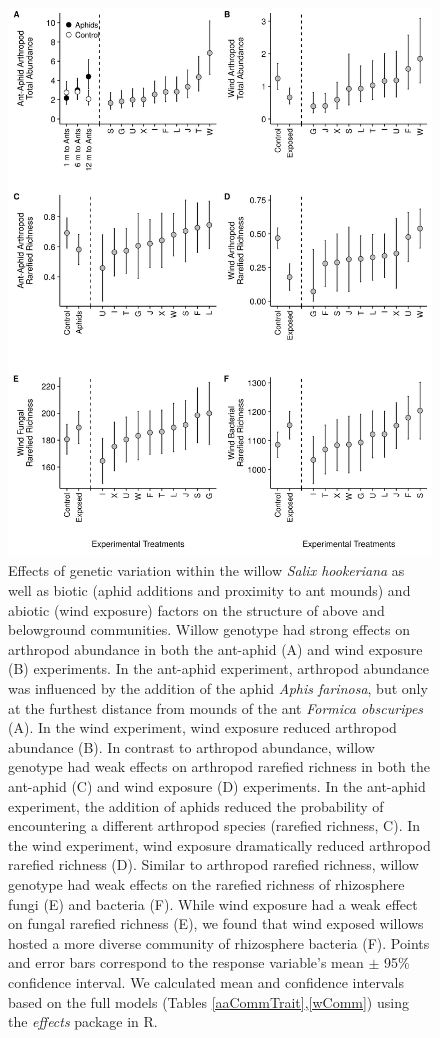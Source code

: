 \documentclass[11pt]{article}
\begin{document}
\begin{figure}%
\centering
\includegraphics[scale = 0.16]{image03.png}
\caption{Effects of genetic variation within the willow
\textit{Salix hookeriana} as well as biotic (aphid additions and proximity
to ant mounds) and abiotic (wind exposure) factors on the structure of
above and belowground communities. Willow genotype had strong effects on
arthropod abundance in both the ant-aphid (A) and wind exposure (B)
experiments. In the ant-aphid experiment, arthropod abundance was
influenced by the addition of the aphid \textit{Aphis farinosa}, but only
at the furthest distance from mounds of the ant \textit{Formica
obscuripes} (A). In the wind experiment, wind exposure reduced arthropod
abundance (B). In contrast to arthropod abundance, willow genotype had weak
effects on arthropod rarefied richness in both the ant-aphid (C) and
wind exposure (D) experiments. In the ant-aphid experiment, the
addition of aphids reduced the probability of encountering a different
arthropod species (rarefied richness, C). In the wind experiment, wind
exposure dramatically reduced arthropod rarefied richness (D). Similar to
arthropod rarefied richness, willow genotype had weak effects on the
rarefied richness of rhizosphere fungi (E) and bacteria (F). While wind
exposure had a weak effect on fungal rarefied richness (E), we found
that wind exposed willows hosted a more diverse community of rhizosphere
bacteria (F). Points and error bars correspond to the response
variable's mean $\pm$ 95\% confidence interval. We calculated mean and confidence intervals based on the full models (Tables \ref{aaCommTrait},\ref{wComm}) using the \textit{effects} package in R.}
\label{Fig:GxEuni}
\end{figure}
\end{document}
